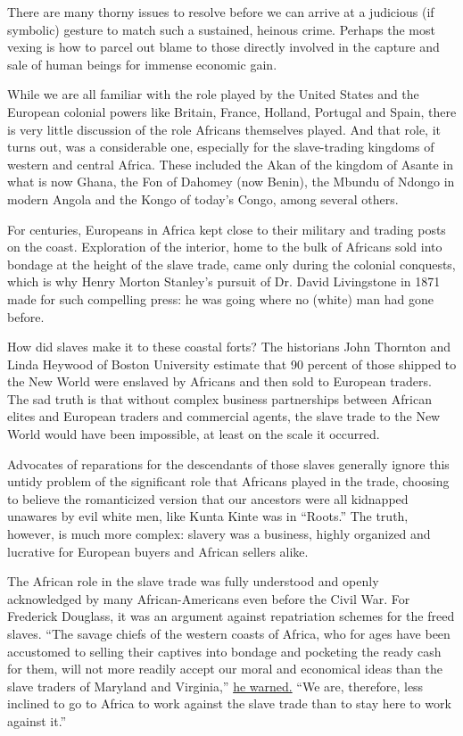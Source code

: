 There are many thorny issues to resolve before we can arrive at a
judicious (if symbolic) gesture to match such a sustained, heinous
crime. Perhaps the most vexing is how to parcel out blame to those
directly involved in the capture and sale of human beings for immense
economic gain.

While we are all familiar with the role played by the United States and
the European colonial powers like Britain, France, Holland, Portugal and
Spain, there is very little discussion of the role Africans themselves
played. And that role, it turns out, was a considerable one, especially
for the slave-trading kingdoms of western and central Africa. These
included the Akan of the kingdom of Asante in what is now Ghana, the Fon
of Dahomey (now Benin), the Mbundu of Ndongo in modern Angola and the
Kongo of today's Congo, among several others.

For centuries, Europeans in Africa kept close to their military and
trading posts on the coast. Exploration of the interior, home to the
bulk of Africans sold into bondage at the height of the slave trade,
came only during the colonial conquests, which is why Henry Morton
Stanley's pursuit of Dr. David Livingstone in 1871 made for such
compelling press: he was going where no (white) man had gone before.

How did slaves make it to these coastal forts? The historians John
Thornton and Linda Heywood of Boston University estimate that 90 percent
of those shipped to the New World were enslaved by Africans and then
sold to European traders. The sad truth is that without complex business
partnerships between African elites and European traders and commercial
agents, the slave trade to the New World would have been impossible, at
least on the scale it occurred.

Advocates of reparations for the descendants of those slaves generally
ignore this untidy problem of the significant role that Africans played
in the trade, choosing to believe the romanticized version that our
ancestors were all kidnapped unawares by evil white men, like Kunta
Kinte was in ``Roots.'' The truth, however, is much more complex:
slavery was a business, highly organized and lucrative for European
buyers and African sellers alike.

The African role in the slave trade was fully understood and openly
acknowledged by many African-Americans even before the Civil War. For
Frederick Douglass, it was an argument against repatriation schemes for
the freed slaves. ``The savage chiefs of the western coasts of Africa,
who for ages have been accustomed to selling their captives into bondage
and pocketing the ready cash for them, will not more readily accept our
moral and economical ideas than the slave traders of Maryland and
Virginia,''
\href{http://www.nytimes3xbfgragh.onion/books/first/g/gates-wonders.html?_r=1}{he
warned.} ``We are, therefore, less inclined to go to Africa to work
against the slave trade than to stay here to work against it.''

